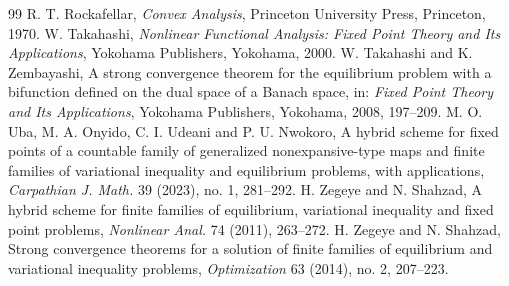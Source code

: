 \documentclass[10pt,a4paper]{amsart}
\numberwithin{equation}{section}
\begin{document}
\begin{thebibliography}{99}
 R. T. Rockafellar, \emph{Convex Analysis}, Princeton University Press, Princeton, 1970.
 W. Takahashi, \emph{Nonlinear Functional Analysis: Fixed Point Theory and Its Applications}, Yokohama Publishers, Yokohama, 2000.
 W. Takahashi and K. Zembayashi, A strong convergence theorem for the equilibrium problem with a bifunction defined on the dual space of a Banach space, in: \emph{Fixed Point Theory and Its Applications}, Yokohama Publishers, Yokohama, 2008, 197--209.
 M. O. Uba, M. A. Onyido, C. I. Udeani and P. U. Nwokoro, A hybrid scheme for fixed points of a countable family of generalized nonexpansive-type maps and finite families of variational inequality and equilibrium problems, with applications, \emph{Carpathian J. Math.} 39 (2023), no. 1, 281--292.
 H. Zegeye and N. Shahzad, A hybrid scheme for finite families of equilibrium, variational inequality and fixed point problems, \emph{Nonlinear Anal.} 74 (2011), 263--272.
 H. Zegeye and N. Shahzad, Strong convergence theorems for a solution of finite families of equilibrium and variational inequality problems, \emph{Optimization} 63 (2014), no. 2, 207--223.
\end{thebibliography}
\end{document}

